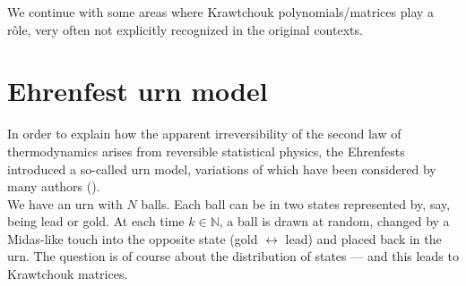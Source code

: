 \documentclass[12pt]{article}
\numberwithin{equation}{section}
\begin{document}
We continue with some areas where Krawtchouk polynomials/matrices play a 
r\^ole, very often not explicitly recognized in the original contexts.


\section{Ehrenfest urn model}

In order to explain how the apparent irreversibility of the second law 
of thermodynamics arises from reversible statistical physics, 
the Ehrenfests introduced a so-called urn model, variations of which have been 
considered by many authors (\cite{ Kac, KMG, Voi}).
\\

We have an urn with $N$ balls. Each ball can be in two states 
represented by, say, being lead or gold.  At each time $k\in\mathbb{N}$, 
a ball is drawn at random, changed by a Midas-like touch into the opposite state
(gold $\leftrightarrow$ lead) and placed back in the urn.
The question is of course about the distribution of states ---
and this leads  to Krawtchouk matrices.
\\
\end{document}
